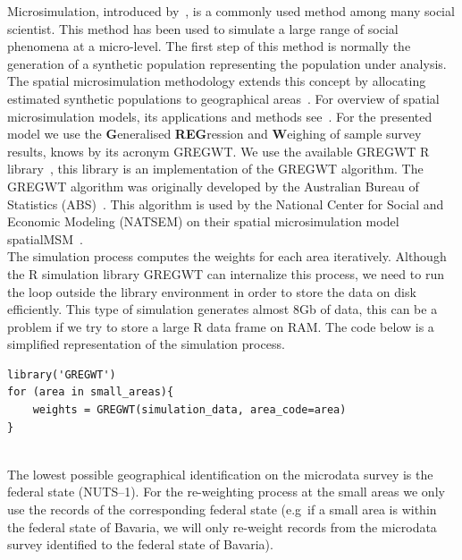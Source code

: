 \documentclass[runningheads,a4paper]{llncs}
\begin{document}
Microsimulation, introduced by~\cite{Orcutt.1957}, is a commonly used method
among many social scientist. This method has been used to simulate a large
range of social phenomena at a micro-level. The first step of this method is
normally the generation of a synthetic population representing the population
under analysis. The spatial microsimulation methodology extends this concept by
allocating estimated synthetic populations to geographical
areas~\cite{Clarke.1987}. For overview of spatial microsimulation models, its
applications and methods see~\cite{Tanton.2014,ODonoghue.2014}. For the
presented model we use the 
\textbf{G}eneralised \textbf{REG}ression and \textbf{W}eighing of
sample survey results, knows by its acronym GREGWT.
We use the available GREGWT R library~\cite{MunozH.2015.GREGWTR}, this library
is an implementation of the GREGWT algorithm. The GREGWT algorithm was
originally developed by the Australian Bureau of Statistics
(ABS)~\cite{Bell.2000}. This algorithm is used by the National Center for
Social and Economic Modeling (NATSEM) on their spatial microsimulation model
spatialMSM~\cite{Tanton.2007,Tanton.2014a}.
\\

The simulation process computes the weights for each area iteratively.
Although the R simulation library GREGWT can internalize this process, we need to
run the loop outside the library environment in order to store the data on disk
efficiently. This type of simulation generates almost 8Gb of data, this can be
a problem if we try to store a large R data frame on RAM. The code below is a
simplified representation of the simulation process.
\\

\begin{lstlisting}
library('GREGWT')
for (area in small_areas){
    weights = GREGWT(simulation_data, area_code=area)
}
\end{lstlisting}
\\

The lowest possible geographical identification on the microdata survey is the
federal state (NUTS--1). For the re-weighting process at the small areas we only use the
records of the corresponding federal state (e.g\ if a small area is within
the federal state of Bavaria, we will only re-weight records from the microdata
survey identified to the federal state of Bavaria).
\\
\end{document}

